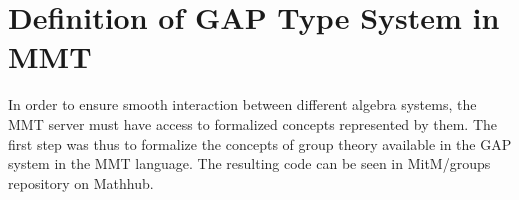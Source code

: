 \section{Definition of GAP Type System in MMT}
In order to ensure smooth interaction between different algebra systems, the MMT server must have access to formalized concepts represented by them. The first step was thus to formalize the concepts of group theory available in the GAP system in the MMT language. The resulting code can be seen in MitM/groups repository on Mathhub\cite{mitm_groups}.